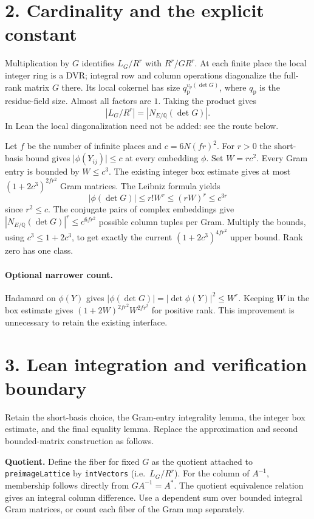 \documentclass[11pt]{article}
\newcommand{\QQ}{\mathbb Q}
\begin{document}
\section*{2. Cardinality and the explicit constant}
Multiplication by $G$ identifies $L_G/R^r$ with $R^r/GR^r$.
At each finite place the local integer ring is a DVR; integral row and
column operations diagonalize the full-rank matrix $G$ there. Its local
cokernel has size $q_{\mathrm{p}}^{v_{\mathrm{p}}(\det G)}$, where
$q_{\mathrm{p}}$ is the residue-field size. Almost all factors are $1$.
Taking the product gives
\[
 |L_G/R^r|=|N_{E/\QQ}(\det G)|.
\]
In Lean the local diagonalization need not be added: see the route below.

Let $f$ be the number of infinite places and $c=6N(fr)^2$. For $r>0$ the
short-basis bound gives $\lvert\phi(Y_{ij})\rvert\le c$ at every
embedding $\phi$. Set $W=rc^2$. Every Gram entry is bounded by $W\le c^3$.
The existing integer box estimate gives at most $(1+2c^3)^{2fr^2}$
Gram matrices. The Leibniz formula yields
\[
 |\phi(\det G)|\le r!W^r\le(rW)^r\le c^{3r}
\]
since $r^2\le c$. The conjugate pairs of complex embeddings give
$|N_{E/\QQ}(\det G)|^r\le c^{6fr^2}$ possible column tuples per Gram.
Multiply the bounds, using $c^3\le 1+2c^3$, to get exactly the current
$(1+2c^3)^{4fr^2}$ upper bound. Rank zero has one class.

\paragraph{Optional narrower count.}
Hadamard on $\phi(Y)$ gives $|\phi(\det G)|=|\det\phi(Y)|^2\le W^r$.
Keeping $W$ in the box estimate gives
$(1+2W)^{2fr^2}W^{2fr^2}$ for positive rank.
This improvement is unnecessary to retain the existing interface.

\section*{3. Lean integration and verification boundary}
Retain the short-basis choice, the Gram-entry integrality lemma, the
integer box estimate, and the final equality lemma. Replace the approximation
and second bounded-matrix construction as follows.

\smallskip\noindent\textbf{Quotient.}
Define the fiber for fixed $G$ as the quotient attached to
\texttt{preimageLattice} by \texttt{intVectors} (i.e.\ $L_G/R^r$).
For the column of $A^{-1}$, membership follows directly from $GA^{-1}=A^\ast$.
The quotient equivalence relation gives an integral column difference.
Use a dependent sum over bounded integral Gram matrices, or count
each fiber of the Gram map separately.
\end{document}
